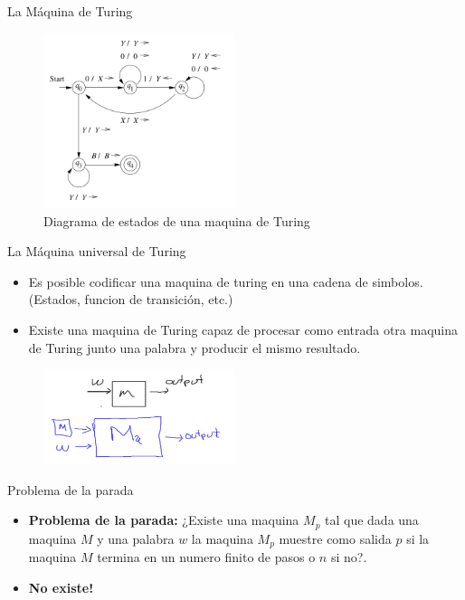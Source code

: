 \documentclass{beamer}
\begin{document}
	\begin{frame}{La Máquina de Turing}
		
			\begin{figure}
			\includegraphics[width=0.5\textwidth]{diagrama_estados.png} 
			\caption{Diagrama de estados de una maquina de Turing}
			\end{figure}
		
	\end{frame}
	
		
	\begin{frame}{La Máquina universal de Turing}
		
		\begin{itemize}
			\item Es posible codificar una maquina de turing en una cadena de simbolos. (Estados, funcion de transición, etc.)
			\item Existe una maquina de Turing capaz de procesar como entrada otra maquina de Turing junto una palabra y producir el mismo resultado.
		\end{itemize}
		\begin{figure}
			\includegraphics[width=0.5\textwidth]{maquina_universal.png}
		\end{figure}
		
	\end{frame}
	
	
	\begin{frame}{Problema de la parada}
		
		\begin{itemize}
			\item \textbf{Problema de la parada:} ¿Existe una maquina $M_p$ tal que dada una maquina $M$ y una palabra $w$ la maquina $M_p$ muestre como salida $p$ si la maquina $M$ termina en un numero finito de pasos o $n$ si no?.
			\pause
			\item \textbf{No existe!}
		\end{itemize}
		
		
	\end{frame}
	
\end{document}
